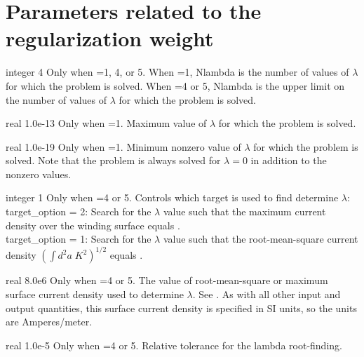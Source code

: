\section{Parameters related to the regularization weight}

{integer}
{4}
{Only when =1, 4, or 5.}
{When =1, {\ttfamily Nlambda} is the number of values of $\lambda$ for which the problem is solved.
When =4 or 5, {\ttfamily Nlambda} is the upper limit on the number of values of $\lambda$ for which the problem is solved.}

\myhrule

{real}
{1.0e-13}
{Only when =1.}
{Maximum value of $\lambda$ for which the problem is solved.}

\myhrule

{real}
{1.0e-19}
{Only when =1.}
{Minimum nonzero value of $\lambda$ for which the problem is solved.
Note that the problem is always solved for $\lambda=0$ in addition to
the nonzero values.}

\myhrule

{integer}
{1}
{Only when =4 or 5.}
{Controls which target is used to find determine $\lambda$:\\

{\ttfamily target\_option} = 2: Search for the $\lambda$ value such that the maximum
current density over the winding surface equals .\\

{\ttfamily target\_option} = 1: Search for the $\lambda$ value such that the root-mean-square current density
$\left( \int d^2a\; K^2 \right)^{1/2}$ equals .
}

\myhrule

{real}
{8.0e6}
{Only when =4 or 5.}
{The value of root-mean-square or maximum surface current density used to determine $\lambda$.
See .
As with all other input and output quantities, this surface current density is specified in SI units,
so the units are Amperes/meter.
}

\myhrule

{real}
{1.0e-5}
{Only when =4 or 5.}
{Relative tolerance for the lambda root-finding.}

